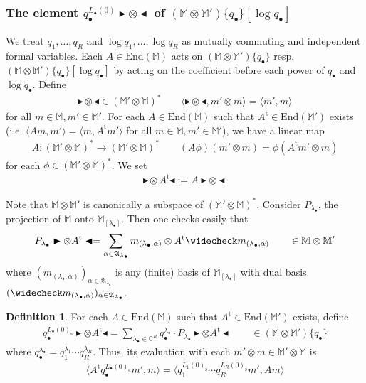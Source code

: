 \documentclass[11pt,b5paper,notitlepage]{article}
\theoremstyle{definition}
\newtheorem{df}{Definition}[subsection]
\theoremstyle{plain}
\newcommand{\fk}{\mathfrak}
\newcommand{\wch}{\widecheck}
\newcommand{\tr}{\mathrm{t}} %
\newcommand{\End}{\mathrm{End}} %
\newcommand{\blt}{\bullet}
\newcommand{\Mbb}{\mathbb M}
\newcommand{\Cbb}{\mathbb C}
\newcommand{\btl}{\blacktriangleleft}
\newcommand{\btr}{\blacktriangleright}
\newcommand{\<}{\left\langle}
\renewcommand{\>}{\right\rangle}
\newcommand{\bk}[1]{\langle {#1}\rangle}
\newcommand{\Lbss}{{L_\bullet(0)_\mathrm{s}}}
\numberwithin{equation}{subsection}
\begin{document}
\subsubsection{The element $q_\blt^{L_\blt(0)}\btr\otimes \btl$ of $(\Mbb\otimes\Mbb')\{q_\blt\}[\log q_\blt]$}

We treat $q_1,\dots,q_R$ and $\log q_1,\dots,\log q_R$ as mutually commuting and independent formal variables. Each $A\in\End(\Mbb)$ acts on $(\Mbb\otimes\Mbb')\{q_\blt\}$ resp. $(\Mbb\otimes\Mbb')\{q_\blt\}[\log q_\blt]$ by acting on the coefficient before each power of $q_\blt$ and $\log q_\blt$. Define
\begin{align*}
\btr\otimes\btl\in(\Mbb'\otimes\Mbb)^*\qquad\bk{\btr\otimes\btl,m'\otimes m}=\bk{m',m}
\end{align*}
for all $m\in\Mbb,m'\in\Mbb'$. For each $A\in\End(\Mbb)$ such that $A^\tr\in\End(\Mbb')$ exists (i.e. $\bk{Am,m'}=\bk{m,A^\tr m'}$ for all $m\in\Mbb,m'\in\Mbb'$), we have a linear map
\begin{align*}
A:(\Mbb'\otimes\Mbb)^*\rightarrow (\Mbb'\otimes\Mbb)^*\qquad (A\phi)(m'\otimes m)=\phi(A^\tr m'\otimes m)
\end{align*}
for each $\phi\in(\Mbb'\otimes\Mbb)^*$. We set
\begin{align*}
\btr\otimes A^\tr\btl:=A\btr\otimes\btl
\end{align*}

Note that $\Mbb\otimes\Mbb'$ is canonically a subspace of $(\Mbb'\otimes\Mbb)^*$. Consider $P_{\lambda_\blt}$, the projection of $\Mbb$ onto $\Mbb_{[\lambda_\blt]}$. Then one checks easily that
\begin{align}\label{eqb69}
P_{\lambda_\blt}\btr\otimes A^\tr\btl=\sum_{\alpha\in\fk A_{\lambda_\blt}} m_{(\lambda_\blt,\alpha)}\otimes A^\tr \wch m_{(\lambda_\blt,\alpha)}\qquad\in \Mbb\otimes\Mbb'
\end{align}
where $(m_{(\lambda_\blt,\alpha)})_{\alpha\in\fk A_{\lambda_\blt}}$ is any (finite) basis of $\Mbb_{[\lambda_\blt]}$ with dual basis $(\wch m_{(\lambda_\blt,\alpha)})_{\alpha\in\fk A_{\lambda_\blt}}$.




\begin{df}
For each $A\in\End(\Mbb)$ such that $A^\tr\in\End(\Mbb')$ exists, define
\begin{gather*}
q_\blt^\Lbss\btr\otimes A^\tr\btl=\sum_{\lambda_\blt\in\Cbb^R} q_\blt^{\lambda_\blt}\cdot P_{\lambda_\blt}\btr\otimes A^\tr\btl\qquad \in(\Mbb\otimes\Mbb')\{q_\blt\}
\end{gather*}
where $q_\blt^{\lambda_\blt}=q_1^{\lambda_1}\cdots q_R^{\lambda_R}$. Thus, its evaluation with each $m'\otimes m\in\Mbb'\otimes\Mbb$ is
\begin{align*}
\bk{A^\tr q_\blt^{\Lbss}m',m}=\bk{q_1^{L_1(0)_{\mathrm s}}\cdots q_R^{L_R(0)_{\mathrm s}}m',Am}
\end{align*}
\end{df}
\end{document}

